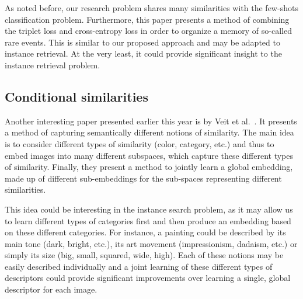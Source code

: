 As noted before, our research problem shares many similarities with the
few-shots classification problem. Furthermore, this paper presents a
method of combining the triplet loss and cross-entropy loss in order to
organize a memory of so-called rare events. This is similar to our proposed
approach and may be adapted to instance retrieval. At the very least,
it could provide significant insight to the instance retrieval problem.

\subsection{Conditional similarities}
Another interesting paper presented earlier this year is by
Veit et al.~\cite{veit_conditional_2017}. It presents a method of
capturing semantically different notions of similarity. The main idea
is to consider different types of similarity (color, category, etc.) and
thus to embed images into many different subspaces, which capture
these different types of similarity. Finally, they present a method
to jointly learn a global embedding, made up of different sub-embeddings
for the sub-spaces representing different similarities.

This idea could be interesting in the instance search problem, as it
may allow us to learn different types of categories first and then produce
an embedding based on these different categories. For instance, a painting
could be described by its main tone (dark, bright, etc.), its art movement
(impressionism, dadaism, etc.) or simply its size (big, small, squared,
wide, high). Each of these notions may be easily described individually
and a joint learning of these different types of descriptors could provide
significant improvements over learning a single, global descriptor for
each image.

